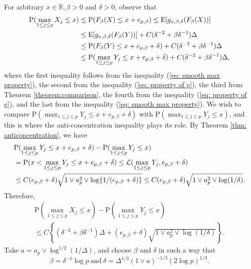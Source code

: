 \documentclass[11pt,reqno]{amsart}
\theoremstyle{definition}
\newcommand{\LL}{ \mathcal{L}}
\newcommand{\Ep}{{\mathrm{E}}}
\renewcommand{\Pr}{{\mathrm{P}}}
\newcommand{\RR}{\mathbb{R}}
\begin{document}
For arbitrary $x \in \RR, \beta > 0$ and $\delta > 0$, observe that
\begin{align}
\Pr ( \max_{1 \leq j \leq p} X_{j}   \leq x )
&\leq \Pr ( F_{\beta} (X) \leq x + e_{p,\beta}) \leq \Ep[g_{x,\beta,\delta}(F_\beta(X))] \notag \\
&\leq \Ep[g_{x,\beta,\delta}(F_\beta(Y))] + C(\delta^{-2}+\beta \delta^{-1})\Delta \notag  \\
&\leq  \Pr ( F_\beta (Y) \leq x+e_{p,\beta}+\delta ) + C(\delta^{-2}+\beta \delta^{-1})\Delta \notag \\
&\leq \Pr (\max_{1 \leq j \leq p} Y_{j} \leq x+e_{p,\beta}+\delta ) + C(\delta^{-2}+\beta \delta^{-1})\Delta, \label{eq: Kdistance-intermediate}
\end{align}
where the first inequality follows from the inequality (\ref{eq: smooth max property}), the second from the inequality (\ref{eq: property of g}),  the third from Theorem \ref{theorem:comparison}, the fourth from the inequality (\ref{eq: property of g}), and the last from the inequality (\ref{eq: smooth max property}).
We wish to compare $\Pr (\max_{1 \leq j \leq p} Y_{j} \leq x+e_{p,\beta}+\delta) $ with $\Pr (\max_{1 \leq j \leq p} Y_{j} \leq x ) $, and this is where the anti-concentration inequality plays its role.
By Theorem \ref{thm: anticoncentration}, we have
\begin{align}
&\Pr (\max_{1 \leq j \leq p} Y_{j} \leq x+e_{p,\beta}+\delta ) -  \Pr (\max_{1 \leq j \leq p} Y_{j} \leq x ) \notag \\
&= \Pr (x < \max_{1 \leq j \leq p} Y_{j} \leq x+e_{p,\beta}+\delta ) \leq \LL ( \max_{1 \leq j \leq p} Y_{j}, e_{p,\beta}+\delta) \label{eq: Kdistance-intermediate2} \\
&\leq  C (e_{p,\beta} + \delta) \sqrt{1 \vee a_{p}^{2} \vee \log \{ 1 / (e_{p,\beta} + \delta) \}} \leq  C (e_{p,\beta} + \delta) \sqrt{1 \vee a_{p}^{2} \vee  \log (1 / \delta)}. \notag
\end{align}
Therefore,
\begin{multline}
\Pr ( \max_{1\leq j\leq p}X_{j}\leq x ) -  \Pr (\max_{1\leq j\leq p}Y_{j}\leq x)  \\
\leq C  \left \{ (\delta^{-2}+\beta \delta^{-1})\Delta +  (e_{p,\beta}+\delta)\sqrt{1 \vee a_{p}^{2} \vee \log(1/\delta)}  \right \}. \label{normalcomp}
\end{multline}
Take $a = a_{p} \vee \log^{1/2}(1/\Delta)$, and choose  $\beta$ and $\delta$ in such a way that
\begin{equation*}
\beta = \delta^{-1}\log p \ \text{and} \ \delta = \Delta^{1/3} (1 \vee a)^{-1/3} (2\log p)^{1/3}.
\end{equation*}
\end{document}
